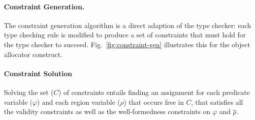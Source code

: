 

\paragraph{Constraint Generation.}
The constraint generation algorithm is a direct adaption of the type checker:
each type checking rule is modified to produce a set of constraints that must hold
for the type checker to succeed.
%
Fig.~\ref{fig:constraint-gen} illustrates this for the object allocator  construct.


\paragraph{Constraint Solution}
Solving the set ($C$) of constraints entails finding an
assignment for each predicate variable $(\varphi$) and each region
variable ($\rho$) that occurs free in $C$, that satisfies all
the validity constraints as well as the well-formedness constraints on
$\varphi$ and $\overline{\rho}$.

